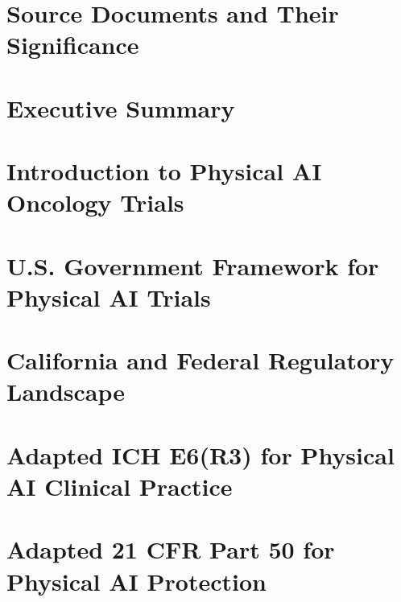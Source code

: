 \documentclass[a4paper,12pt,twoside]{article}
\begin{document}
\pagestyle{body}




\newpage

\section*{Source Documents and Their Significance}

\newpage

\section*{Executive Summary}

\newpage

\pagestyle{body}

\section{Introduction to Physical AI Oncology Trials}
\label{sec:introduction}

\newpage

\section{U.S. Government Framework for Physical AI Trials}
\label{sec:gov-framework}

\newpage

\section{California and Federal Regulatory Landscape}
\label{sec:regulatory-landscape}

\newpage

\section{Adapted ICH E6(R3) for Physical AI Clinical Practice}
\label{sec:ich-e6r3}

\newpage

\section{Adapted 21 CFR Part 50 for Physical AI Protection}
\label{sec:cfr50}

\newpage
\end{document}
